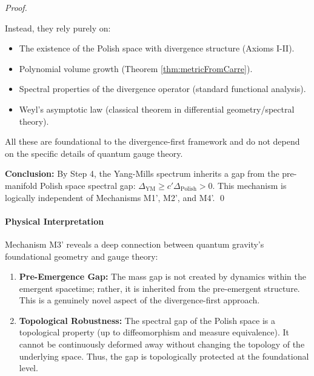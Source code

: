 \begin{lemma}
\begin{proof}
\begin{itemize}
\end{itemize}

Instead, they rely purely on:

\begin{itemize}

\item The existence of the Polish space with divergence structure (Axioms I-II).
\item Polynomial volume growth (Theorem \ref{thm:metricFromCarre}).
\item Spectral properties of the divergence operator (standard functional analysis).
\item Weyl's asymptotic law (classical theorem in differential geometry/spectral theory).

\end{itemize}

All these are foundational to the divergence-first framework and do not depend on the specific details of quantum gauge theory.

\textbf{Conclusion:} By Step 4, the Yang-Mills spectrum inherits a gap from the pre-manifold Polish space spectral gap: $\Delta_{\text{YM}} \geq c' \Delta_{\text{Polish}} > 0$. This mechanism is logically independent of Mechanisms M1', M2', and M4'. \qed

\end{proof}

\paragraph{Physical Interpretation}

Mechanism M3' reveals a deep connection between quantum gravity's foundational geometry and gauge theory:

\begin{enumerate}

\item \textbf{Pre-Emergence Gap:} The mass gap is not created by dynamics within the emergent spacetime; rather, it is inherited from the pre-emergent structure. This is a genuinely novel aspect of the divergence-first approach.

\item \textbf{Topological Robustness:} The spectral gap of the Polish space is a topological property (up to diffeomorphism and measure equivalence). It cannot be continuously deformed away without changing the topology of the underlying space. Thus, the gap is topologically protected at the foundational level.


\end{enumerate}
\end{lemma}
